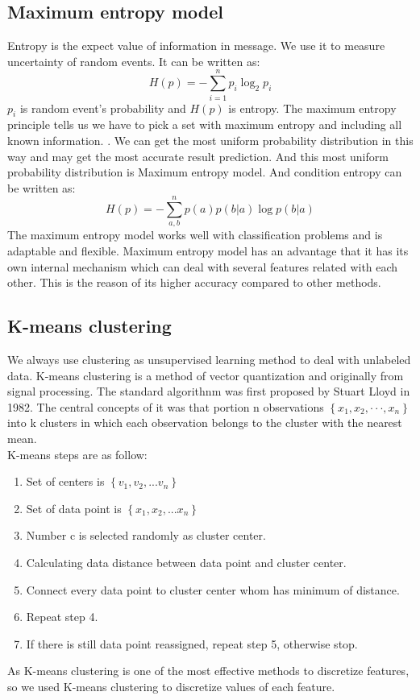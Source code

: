 \documentclass[sigconf]{acmart}
\begin{document}
\subsection{Maximum entropy model}
Entropy is the expect value of information in message. We use it to measure uncertainty of random events. \cite{cite01} It can be written as:
\begin{equation*}
H(p) = -\sum_{i=1}^np_i\log_2 p_i
\end{equation*}
$p_i$ is random event's probability and $H(p)$ is entropy. The maximum entropy principle tells us we have to pick a set with maximum entropy and including all known information. \cite{cite02}. We can get the most uniform probability distribution in this way and may get the most accurate result prediction. And this most uniform probability distribution is Maximum entropy model. \cite{cite03} And condition entropy can be written as:\\
\begin{equation*}
H(p) = -\sum_{a,b}^n p(a)p(b|a)\log p(b|a)
\end{equation*}
The maximum entropy model works well with classification problems and is adaptable and flexible. Maximum entropy model has an advantage that it has its own internal mechanism which can deal with several features related with each other. This is the reason of its higher accuracy compared to other methods. 
\subsection{K-means clustering}
We always use clustering as unsupervised learning method to deal with unlabeled data. K-means clustering is a method of vector quantization and originally from signal processing.\cite{cite04} The standard algorithnm was first proposed by Stuart Lloyd in 1982.\cite{cite05} The central concepts of it was that portion n observations $\left\{x_1, x_2, · · ·, x_n\right\}$ into k clusters in which each observation belongs to the cluster with the nearest mean. \cite{cite06} \\
K-means steps are as follow:
\begin{enumerate}
    \item Set of centers is $\left\{v_1,v_2,...v_n\right\}$
    \item Set of data point is $\left\{x_1,x_2,...x_n\right\}$
    \item Number c is selected randomly as cluster center.
    \item Calculating data distance between data point and cluster center.
    \item Connect every data point to cluster center whom has minimum of distance.
    \item Repeat step 4.
    \item If there is still data point reassigned, repeat step 5, otherwise stop.
\end{enumerate}
As K-means clustering is one of the most effective methods to discretize features, so we used K-means clustering to discretize values of each feature.\cite{cite07}\\
\end{document}
